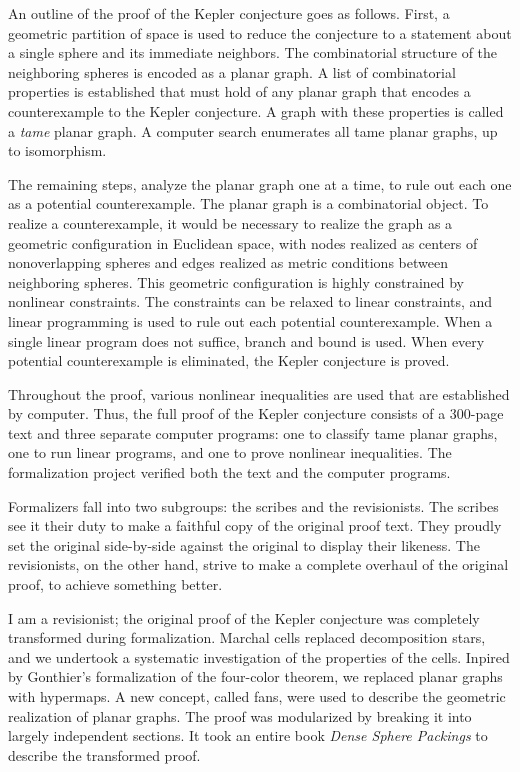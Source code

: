 \documentclass{amsart}
\begin{document}
An outline of the proof of the Kepler conjecture goes as follows.
First, a geometric partition of space is used to reduce the conjecture
to a statement about a single sphere and its immediate neighbors.  The
combinatorial structure of the neighboring spheres is encoded as a
planar graph.  A list of combinatorial properties is established that
must hold of any planar graph that encodes a counterexample to the
Kepler conjecture.  A graph with these properties is called a
\emph{tame} planar graph.  A computer search enumerates all tame
planar graphs, up to isomorphism.

The remaining steps, analyze the planar graph one at a time, to rule
out each one as a potential counterexample.  The planar graph is a
combinatorial object.  To realize a counterexample, it would be
necessary to realize the graph as a geometric configuration in
Euclidean space, with nodes realized as centers of nonoverlapping
spheres and edges realized as metric conditions between neighboring
spheres.  This geometric configuration is highly constrained by
nonlinear constraints.  The constraints can be relaxed to linear
constraints, and linear programming is used to rule out each potential
counterexample.  When a single linear program does not suffice, branch
and bound is used.  When every potential counterexample is eliminated,
the Kepler conjecture is proved.

Throughout the proof, various nonlinear inequalities are used that are
established by computer.  Thus, the full proof of the Kepler
conjecture consists of a 300-page text and three separate computer
programs: one to classify tame planar graphs, one to run linear
programs, and one to prove nonlinear inequalities.  The formalization
project verified both the text and the computer programs.



Formalizers fall into two subgroups: the scribes and the revisionists.
The scribes see it their duty to make a faithful copy of the original
proof text.  They proudly set the original side-by-side against the
original to display their likeness. The revisionists, on the other
hand, strive to make a complete overhaul of the original proof, to
achieve something better.

I am a revisionist; the original proof of the Kepler conjecture was
completely transformed during formalization. Marchal cells replaced
decomposition stars, and we undertook a systematic investigation of
the properties of the cells.  Inpired by Gonthier's formalization of
the four-color theorem, we replaced planar graphs with hypermaps.  A
new concept, called fans, were used to describe the geometric
realization of planar graphs.  The proof was modularized by breaking
it into largely independent sections.  It took an entire book
\emph{Dense Sphere Packings} to describe the transformed proof.
\end{document}

